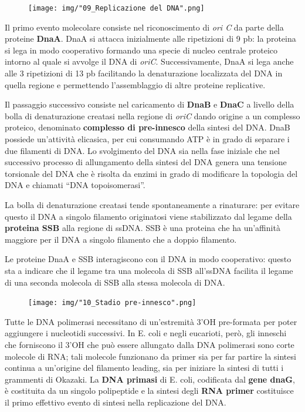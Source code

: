 \documentclass[11pt]{book}
\begin{document}
\begin{figure}[htp]
\centering
\texttt{[image: img/"09\_Replicazione del DNA".png]}
\caption{}
\label{replicazione-del-dna}
\end{figure}

Il primo evento molecolare consiste nel riconoscimento di \emph{ori C}
da parte della proteine \textbf{DnaA}. DnaA si attacca inizialmente alle
ripetizioni di 9 pb: la proteina si lega in modo cooperativo formando
una specie di nucleo centrale proteico intorno al quale si avvolge il
DNA di \emph{oriC}. Successivamente, DnaA si lega anche alle 3
ripetizioni di 13 pb facilitando la denaturazione localizzata del DNA in
quella regione e permettendo l'assemblaggio di altre proteine
replicative.

Il passaggio successivo consiste nel caricamento di \textbf{DnaB} e
\textbf{DnaC} a livello della bolla di denaturazione creatasi nella
regione di \emph{oriC} dando origine a un complesso proteico, denominato
\textbf{complesso di pre-innesco} della sintesi del DNA. DnaB possiede
un'attività elicasica, per cui consumando ATP è in grado di separare i
due filamenti di DNA. Lo svolgimento del DNA sia nella fase iniziale che
nel successivo processo di allungamento della sintesi del DNA genera una
tensione torsionale del DNA che è risolta da enzimi in grado di
modificare la topologia del DNA e chiamati ``DNA topoisomerasi''.

La bolla di denaturazione creatasi tende spontaneamente a rinaturare:
per evitare questo il DNA a singolo filamento originatosi viene
stabilizzato dal legame della \textbf{proteina SSB} alla regione di
ssDNA. SSB è una proteina che ha un'affinità maggiore per il DNA a
singolo filamento che a doppio filamento.

Le proteine DnaA e SSB interagiscono con il DNA in modo cooperativo:
questo sta a indicare che il legame tra una molecola di SSB all'ssDNA
facilita il legame di una seconda molecola di SSB alla stessa molecola
di DNA.

\begin{figure}[htp]
\centering
\texttt{[image: img/"10\_Stadio pre-innesco".png]}
\caption{}
\label{stadio-pre-innesco}
\end{figure}

Tutte le DNA polimerasi necessitano di un'estremità 3'OH pre-formata per
poter aggiungere i nucleotidi successivi. In E. coli e negli eucarioti,
però, gli inneschi che forniscono il 3'OH che può essere allungato dalla
DNA polimerasi sono corte molecole di RNA; tali molecole funzionano da
primer sia per far partire la sintesi continua a un'origine del
filamento leading, sia per iniziare la sintesi di tutti i grammenti di
Okazaki. La \textbf{DNA primasi} di E. coli, codificata dal \textbf{gene
dnaG}, è costituita da un singolo polipeptide e la sintesi degli
\textbf{RNA primer} costituisce il primo effettivo evento di sintesi
nella replicazione del DNA.
\end{document}
